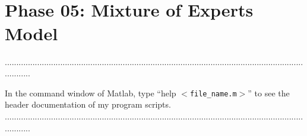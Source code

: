 \documentclass[a4paper,12pt]{article} %
\begin{document}
\pagestyle{fancy}
 \renewcommand{\headrulewidth}{1pt}
\sectionfont{\fontsize{12}{15}\selectfont}
\vspace{2cm}


\section*{\\Phase 05: Mixture of Experts Model}
............................................................................................................................................

In the command window of Matlab, type ``help $<$\verb|file_name.m|$>$'' to see the header documentation of my program scripts.\\
............................................................................................................................................
\end{document}
